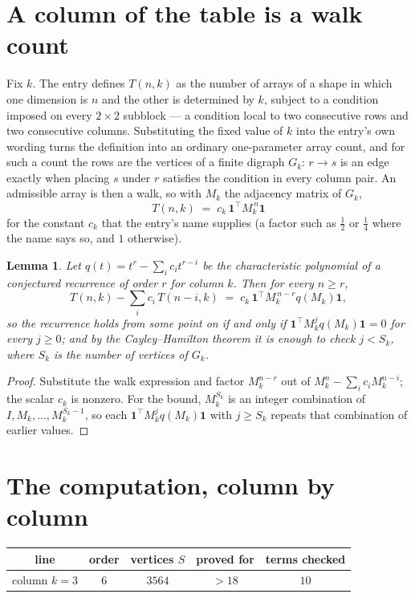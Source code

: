 \documentclass[11pt,a4paper]{article}
\theoremstyle{plain}
\newtheorem{lemma}[theorem]{Lemma}
\theoremstyle{definition}
\begin{document}
\section{A column of the table is a walk count}

Fix $k$. The entry defines $T(n,k)$ as the number of arrays of a shape in which one dimension
is $n$ and the other is determined by $k$, subject to a condition imposed on every
$2\times2$ subblock --- a condition local to two consecutive rows and two consecutive columns.
Substituting the fixed value of $k$ into the entry's own wording turns the definition into an
ordinary one-parameter array count, and for such a count the rows are the vertices of a finite
digraph $G_k$: $r\to s$ is an edge exactly when placing $s$ under $r$ satisfies the condition
in every column pair. An admissible array is then a walk, so with $M_k$ the adjacency matrix
of $G_k$,
\[
T(n,k)\;=\;c_k\,\mathbf{1}^{\!\top}M_k^{\,n}\mathbf{1}
\]
for the constant $c_k$ that the entry's name supplies (a factor such as $\tfrac12$ or
$\tfrac14$ where the name says so, and $1$ otherwise).

\begin{lemma}\label{lem:crit}
Let $q(t)=t^{r}-\sum_i c_it^{r-i}$ be the characteristic polynomial of a conjectured
recurrence of order $r$ for column $k$. Then for every $n\ge r$,
\[
T(n,k)-\sum_i c_i\,T(n-i,k)\;=\;c_k\,\mathbf{1}^{\!\top}M_k^{\,n-r}q(M_k)\mathbf{1},
\]
so the recurrence holds from some point on if and only if
$\mathbf{1}^{\!\top}M_k^{j}q(M_k)\mathbf{1}=0$ for every $j\ge0$; and by the
Cayley--Hamilton theorem it is enough to check $j<S_k$, where $S_k$ is the number of vertices
of $G_k$.
\end{lemma}

\begin{proof}
Substitute the walk expression and factor $M_k^{n-r}$ out of $M_k^{n}-\sum_ic_iM_k^{n-i}$;
the scalar $c_k$ is nonzero. For the bound, $M_k^{S_k}$ is an integer combination of
$I,M_k,\dots,M_k^{S_k-1}$, so each $\mathbf{1}^{\!\top}M_k^{j}q(M_k)\mathbf{1}$ with
$j\ge S_k$ repeats that combination of earlier values.
\end{proof}

\section{The computation, column by column}

\begin{center}
\begin{tabular}{ccccc}
line & order & vertices $S$ & proved for & terms checked \\ \hline
column $k$$=3$ & $6$ & $3564$ & $>18$ & $10$ \\
\end{tabular}
\end{center}
\end{document}

